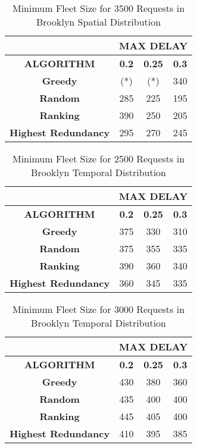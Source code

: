 \documentclass[urop]{socreport}
\begin{document}
\begin{table}[h!]
    \centering
    \begin{tabular}{|c|c|c|c|}
        \hline
         & \multicolumn{3}{|c|}{\textbf{MAX DELAY}}\\
         \hline
         \textbf{ALGORITHM} & \textbf{0.2} & \textbf{0.25}& \textbf{0.3}\\
         \hline \hline
         \textbf{Greedy} & (*) & (*) & 340\\
         \hline
         \textbf{Random} & 285 & 225& 195\\
         \hline
         \textbf{Ranking} & 390 & 250 & 205\\
         \hline
         \textbf{Highest Redundancy} & 295 & 270 & 245\\
        \hline
    \end{tabular}
    \caption{Minimum Fleet Size for 3500 Requests in Brooklyn Spatial Distribution}
    \label{tab:exp3_peaks3500}
\end{table}

\begin{table}[h!]
    \centering
    \begin{tabular}{|c|c|c|c|}
        \hline
         & \multicolumn{3}{|c|}{\textbf{MAX DELAY}}\\
         \hline
         \textbf{ALGORITHM} & \textbf{0.2} & \textbf{0.25}& \textbf{0.3}\\
         \hline \hline
         \textbf{Greedy} & 375 & 330 & 310\\
         \hline
         \textbf{Random} & 375 & 355& 335\\
         \hline
         \textbf{Ranking} & 390 & 360 & 340\\
         \hline
         \textbf{Highest Redundancy} & 360 & 345 & 335\\
        \hline
    \end{tabular}
    \caption{Minimum Fleet Size for 2500 Requests in Brooklyn Temporal Distribution}
    \label{tab:exp3_peakt2500}
\end{table}

\begin{table}[h!]
    \centering
    \begin{tabular}{|c|c|c|c|}
        \hline
         & \multicolumn{3}{|c|}{\textbf{MAX DELAY}}\\
         \hline
         \textbf{ALGORITHM} & \textbf{0.2} & \textbf{0.25}& \textbf{0.3}\\
         \hline \hline
         \textbf{Greedy} & 430 & 380 & 360\\
         \hline
         \textbf{Random} & 435 & 400& 400\\
         \hline
         \textbf{Ranking} & 445 & 405 & 400\\
         \hline
         \textbf{Highest Redundancy} & 410 & 395 & 385\\
        \hline
    \end{tabular}
    \caption{Minimum Fleet Size for 3000 Requests in Brooklyn Temporal Distribution}
    \label{tab:exp3_peakt3000}
\end{table}
\end{document}
